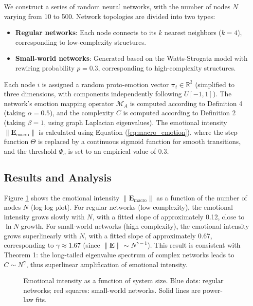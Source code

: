 \documentclass[12pt,a4paper]{article}
\theoremstyle{plain}
\newcommand{\ve}[1]{\bm{#1}}                    %
\newcommand{\Evec}{\ve{E}}                        %
\begin{document}
We construct a series of random neural networks, with the number of nodes $N$ varying from 10 to 500. Network topologies are divided into two types:
\begin{itemize}
    \item \textbf{Regular networks}: Each node connects to its $k$ nearest neighbors ($k=4$), corresponding to low-complexity structures.
    \item \textbf{Small-world networks}: Generated based on the Watts-Strogatz model with rewiring probability $p=0.3$, corresponding to high-complexity structures.
\end{itemize}

Each node $i$ is assigned a random proto-emotion vector $\ve{\tau}_i \in \mathbb{R}^3$ (simplified to three dimensions, with components independently following $U[-1,1]$). The network's emotion mapping operator $\mathcal{M}_A$ is computed according to Definition 4 (taking $\alpha=0.5$), and the complexity $C$ is computed according to Definition 2 (taking $\beta=1$, using graph Laplacian eigenvalues). The emotional intensity $\|\Evec_{\text{macro}}\|$ is calculated using Equation (\ref{eq:macro_emotion}), where the step function $\Theta$ is replaced by a continuous sigmoid function for smooth transitions, and the threshold $\Phi_c$ is set to an empirical value of 0.3.

\subsection{Results and Analysis}

Figure \ref{fig:scaling} shows the emotional intensity $\|\Evec_{\text{macro}}\|$ as a function of the number of nodes $N$ (log-log plot). For regular networks (low complexity), the emotional intensity grows slowly with $N$, with a fitted slope of approximately 0.12, close to $\ln N$ growth. For small-world networks (high complexity), the emotional intensity grows superlinearly with $N$, with a fitted slope of approximately 0.67, corresponding to $\gamma \approx 1.67$ (since $\|\Evec\| \sim N^{\gamma-1}$). This result is consistent with Theorem 1: the long-tailed eigenvalue spectrum of complex networks leads to $C \sim N^{\gamma}$, thus superlinear amplification of emotional intensity.

\begin{figure}[h]
\centering
\caption{Emotional intensity as a function of system size. Blue dots: regular networks; red squares: small-world networks. Solid lines are power-law fits.}
\label{fig:scaling}
\end{figure}
\end{document}
